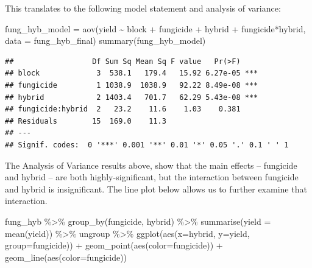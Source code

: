 \documentclass[
]{book}
\newenvironment{Shaded}{\begin{snugshade}}{\end{snugshade}}
\newcommand{\AttributeTok}[1]{\textcolor[rgb]{0.77,0.63,0.00}{#1}}
\newcommand{\FunctionTok}[1]{\textcolor[rgb]{0.00,0.00,0.00}{#1}}
\newcommand{\NormalTok}[1]{#1}
\newcommand{\OtherTok}[1]{\textcolor[rgb]{0.56,0.35,0.01}{#1}}
\newcommand{\SpecialCharTok}[1]{\textcolor[rgb]{0.00,0.00,0.00}{#1}}
\begin{document}
This translates to the following model statement and analysis of variance:

\begin{Shaded}
\begin{Highlighting}[]
\NormalTok{fung\_hyb\_model }\OtherTok{=} \FunctionTok{aov}\NormalTok{(yield }\SpecialCharTok{\textasciitilde{}}\NormalTok{ block }\SpecialCharTok{+}\NormalTok{ fungicide }\SpecialCharTok{+}\NormalTok{ hybrid }\SpecialCharTok{+}\NormalTok{ fungicide}\SpecialCharTok{*}\NormalTok{hybrid, }\AttributeTok{data =}\NormalTok{ fung\_hyb\_final)}
\FunctionTok{summary}\NormalTok{(fung\_hyb\_model)}
\end{Highlighting}
\end{Shaded}

\begin{verbatim}
##                  Df Sum Sq Mean Sq F value   Pr(>F)    
## block             3  538.1   179.4   15.92 6.27e-05 ***
## fungicide         1 1038.9  1038.9   92.22 8.49e-08 ***
## hybrid            2 1403.4   701.7   62.29 5.43e-08 ***
## fungicide:hybrid  2   23.2    11.6    1.03    0.381    
## Residuals        15  169.0    11.3                     
## ---
## Signif. codes:  0 '***' 0.001 '**' 0.01 '*' 0.05 '.' 0.1 ' ' 1
\end{verbatim}

The Analysis of Variance results above, show that the main effects -- fungicide and hybrid -- are both highly-significant, but the interaction between fungicide and hybrid is insignificant. The line plot below allows us to further examine that interaction.

\begin{Shaded}
\begin{Highlighting}[]
\NormalTok{fung\_hyb }\SpecialCharTok{\%\textgreater{}\%}
  \FunctionTok{group\_by}\NormalTok{(fungicide, hybrid) }\SpecialCharTok{\%\textgreater{}\%}
  \FunctionTok{summarise}\NormalTok{(}\AttributeTok{yield =} \FunctionTok{mean}\NormalTok{(yield)) }\SpecialCharTok{\%\textgreater{}\%}
\NormalTok{  ungroup }\SpecialCharTok{\%\textgreater{}\%}
  \FunctionTok{ggplot}\NormalTok{(}\FunctionTok{aes}\NormalTok{(}\AttributeTok{x=}\NormalTok{hybrid, }\AttributeTok{y=}\NormalTok{yield, }\AttributeTok{group=}\NormalTok{fungicide)) }\SpecialCharTok{+}
  \FunctionTok{geom\_point}\NormalTok{(}\FunctionTok{aes}\NormalTok{(}\AttributeTok{color=}\NormalTok{fungicide)) }\SpecialCharTok{+}
  \FunctionTok{geom\_line}\NormalTok{(}\FunctionTok{aes}\NormalTok{(}\AttributeTok{color=}\NormalTok{fungicide))}
\end{Highlighting}
\end{Shaded}
\end{document}
